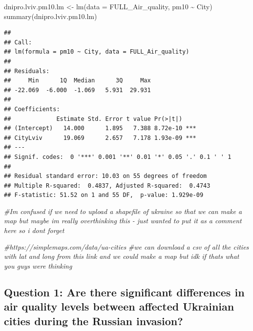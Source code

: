 \documentclass[
  12pt,
]{article}
\newenvironment{Shaded}{\begin{snugshade}}{\end{snugshade}}
\newcommand{\AttributeTok}[1]{\textcolor[rgb]{0.77,0.63,0.00}{#1}}
\newcommand{\CommentTok}[1]{\textcolor[rgb]{0.56,0.35,0.01}{\textit{#1}}}
\newcommand{\FunctionTok}[1]{\textcolor[rgb]{0.00,0.00,0.00}{#1}}
\newcommand{\NormalTok}[1]{#1}
\newcommand{\OtherTok}[1]{\textcolor[rgb]{0.56,0.35,0.01}{#1}}
\newcommand{\SpecialCharTok}[1]{\textcolor[rgb]{0.00,0.00,0.00}{#1}}
\begin{document}
\begin{Shaded}
\begin{Highlighting}[]
\NormalTok{dnipro.lviv.pm10.lm }\OtherTok{\textless{}{-}} \FunctionTok{lm}\NormalTok{(}\AttributeTok{data =}\NormalTok{ FULL\_Air\_quality, pm10 }\SpecialCharTok{\textasciitilde{}}\NormalTok{ City) }
\FunctionTok{summary}\NormalTok{(dnipro.lviv.pm10.lm)}
\end{Highlighting}
\end{Shaded}

\begin{verbatim}
## 
## Call:
## lm(formula = pm10 ~ City, data = FULL_Air_quality)
## 
## Residuals:
##     Min      1Q  Median      3Q     Max 
## -22.069  -6.000  -1.069   5.931  29.931 
## 
## Coefficients:
##             Estimate Std. Error t value Pr(>|t|)    
## (Intercept)   14.000      1.895   7.388 8.72e-10 ***
## CityLviv      19.069      2.657   7.178 1.93e-09 ***
## ---
## Signif. codes:  0 '***' 0.001 '**' 0.01 '*' 0.05 '.' 0.1 ' ' 1
## 
## Residual standard error: 10.03 on 55 degrees of freedom
## Multiple R-squared:  0.4837, Adjusted R-squared:  0.4743 
## F-statistic: 51.52 on 1 and 55 DF,  p-value: 1.929e-09
\end{verbatim}

\begin{Shaded}
\begin{Highlighting}[]
\CommentTok{\#I\textquotesingle{}m confused if we need to upload a shapefile of ukraine so that we can make a map but maybe im really overthinking this {-} just wanted to put it as a comment here so i dont forget }

\CommentTok{\#https://simplemaps.com/data/ua{-}cities}
\CommentTok{\#we can download a csv of all the cities with lat and long from this link and we could make a map but idk if thats what you guys were thinking}
\end{Highlighting}
\end{Shaded}

\hypertarget{question-1-are-there-significant-differences-in-air-quality-levels-between-affected-ukrainian-cities-during-the-russian-invasion}{%
\subsection{Question 1: Are there significant differences in air quality
levels between affected Ukrainian cities during the Russian
invasion?}\label{question-1-are-there-significant-differences-in-air-quality-levels-between-affected-ukrainian-cities-during-the-russian-invasion}}
\end{document}
